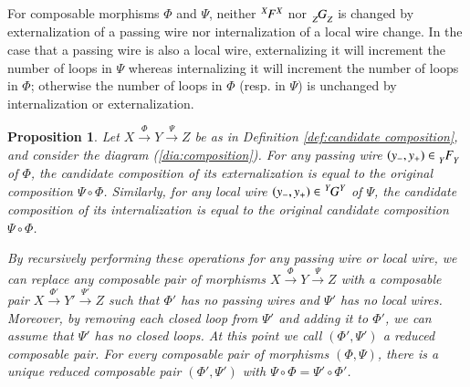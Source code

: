 \documentclass{amsart}
\newcommand{\To}[1]{\xrightarrow{#1}}
\newcommand{\feeddd}[3]{{\tensor*[^{#2}_{\color{white}{!}}]{{#1}}{^{#3}}}}%
\newcommand{\feedcc}[3]{{\tensor*[^{\color{white}{!}}_{#2}]{{#1}}{_{#3}}}}
\newtheorem{proposition}[subsection]{Proposition}
\theoremstyle{remark}
\theoremstyle{definition}
\begin{document}
For composable morphisms $\Phi$ and $\Psi$, neither $\feeddd{F}{X}{X}$ nor $\feedcc{G}{Z}{Z}$ is changed by externalization of a passing wire nor internalization of a local wire change. In the case that a passing wire is also a local wire, externalizing it will increment the number of loops in $\Psi$ whereas internalizing it will increment the number of loops in $\Phi$; otherwise the number of loops in $\Phi$ (resp. in $\Psi$) is unchanged by internalization or externalization.

\begin{proposition}\label{prop:set theoretic cob1}
Let $X\To{\Phi}Y\To{\Psi}Z$ be as in Definition \ref{def:candidate composition}, and consider the diagram (\ref{dia:composition}). For any passing wire $(y_-,y_+)\in\feedcc{F}{Y}{Y}$ of $\Phi$, the candidate composition of its externalization is equal to the original composition $\Psi\circ\Phi$. Similarly, for any local wire $(y_-,y_+)\in\feeddd{G}{Y}{Y}$ of $\Psi$, the candidate composition of its internalization is equal to the original candidate composition $\Psi\circ\Phi$. 

By recursively performing these operations for any passing wire or local wire, we can replace any composable pair of morphisms $X\To{\Phi}Y\To{\Psi}Z$ with a composable pair $X\To{\Phi'}Y'\To{\Psi'}Z$ such that $\Phi'$ has no passing wires and $\Psi'$ has no local wires. Moreover, by removing each closed loop from $\Psi'$ and adding it to $\Phi'$, we can assume that $\Psi'$ has no closed loops. At this point we call $(\Phi',\Psi')$ a {\em reduced composable pair}. For every composable pair of morphisms $(\Phi,\Psi)$, there is a unique reduced composable pair $(\Phi',\Psi')$ with $\Psi\circ\Phi=\Psi'\circ\Phi'$.


\end{proposition}
\end{document}
